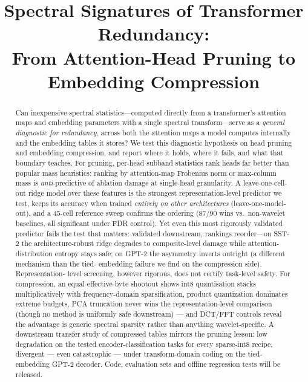 \documentclass[conference]{IEEEtran}
\begin{document}
\title{Spectral Signatures of Transformer Redundancy:\\
From Attention-Head Pruning to Embedding Compression}

\author{
}

\maketitle

\begin{abstract}
Can inexpensive spectral statistics---computed directly from a
transformer's attention maps and embedding parameters with a single
spectral transform---serve as a
\emph{general diagnostic for redundancy}, across both the attention maps
a model computes internally and the embedding tables it stores? We test
this diagnostic hypothesis on head pruning and embedding compression,
and report where it holds, where it fails, and what that boundary teaches.
For pruning, per-head subband statistics rank heads far better than
popular mass heuristics: ranking by attention-map Frobenius norm or
max-column mass is \emph{anti}-predictive of ablation damage at
single-head granularity. A leave-one-cell-out ridge model over these
features is the strongest representation-level predictor we test, keeps
its accuracy when trained \emph{entirely on other architectures}
(leave-one-model-out), and a 45-cell reference sweep confirms the
ordering (87/90 wins vs.\ non-wavelet baselines, all significant under
FDR control). Yet even this most rigorously validated predictor fails
the test that matters: validated downstream, rankings reorder---on
SST-2 the architecture-robust ridge degrades to composite-level
damage while attention-distribution entropy stays safe; on GPT-2 the
asymmetry inverts outright (a different mechanism than the tied-
embedding failure we find on the compression side). Representation-
level screening, however rigorous, does not certify task-level safety.
For compression, an
equal-effective-byte shootout shows int8 quantisation stacks
multiplicatively with frequency-domain sparsification, product
quantization dominates extreme budgets, PCA truncation never wins the
representation-level comparison (though no method is uniformly safe
downstream) ---
and DCT/FFT controls reveal the advantage is generic spectral sparsity
rather than anything wavelet-specific. A downstream transfer study
of compressed tables mirrors the pruning lesson: low degradation on the
tested encoder-classification tasks for every sparse-int8 recipe,
divergent --- even
catastrophic --- under transform-domain coding on the tied-embedding
GPT-2 decoder. Code, evaluation sets and offline
regression tests will be released.
\end{abstract}
\end{document}
